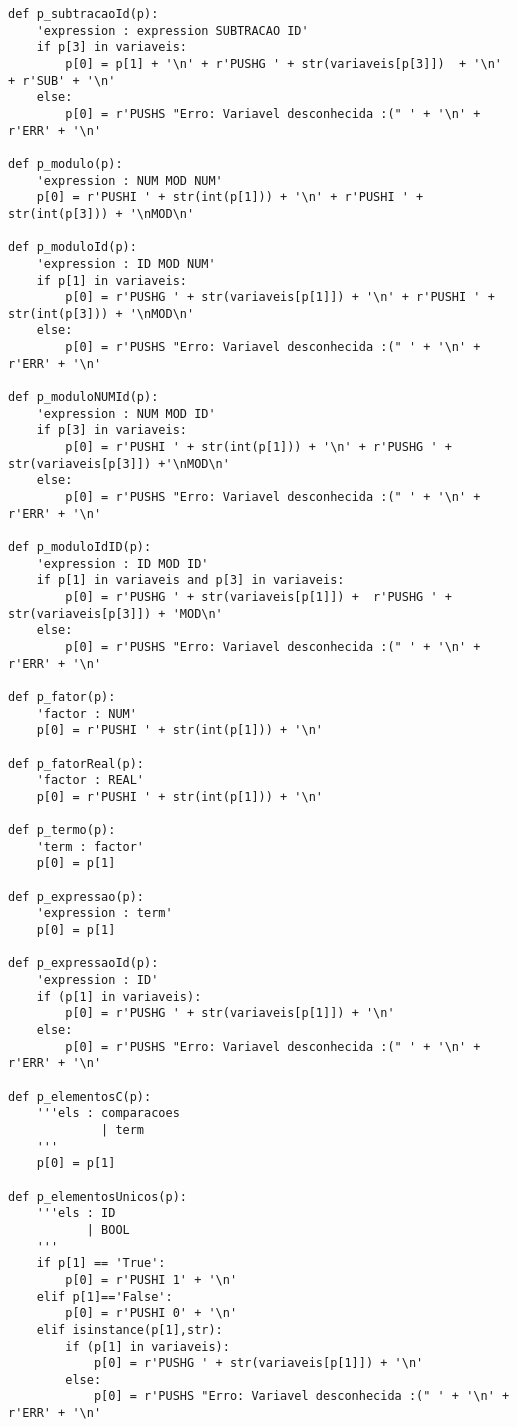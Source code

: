 \documentclass[11pt,a4paper]{report}%
\begin{document}
\begin{lstlisting}
def p_subtracaoId(p): 
    'expression : expression SUBTRACAO ID'
    if p[3] in variaveis: 
        p[0] = p[1] + '\n' + r'PUSHG ' + str(variaveis[p[3]])  + '\n' + r'SUB' + '\n'
    else: 
        p[0] = r'PUSHS "Erro: Variavel desconhecida :(" ' + '\n' + r'ERR' + '\n'

def p_modulo(p): 
    'expression : NUM MOD NUM'
    p[0] = r'PUSHI ' + str(int(p[1])) + '\n' + r'PUSHI ' + str(int(p[3])) + '\nMOD\n'

def p_moduloId(p): 
    'expression : ID MOD NUM'
    if p[1] in variaveis: 
        p[0] = r'PUSHG ' + str(variaveis[p[1]]) + '\n' + r'PUSHI ' + str(int(p[3])) + '\nMOD\n'
    else: 
        p[0] = r'PUSHS "Erro: Variavel desconhecida :(" ' + '\n' + r'ERR' + '\n'

def p_moduloNUMId(p): 
    'expression : NUM MOD ID'
    if p[3] in variaveis:
        p[0] = r'PUSHI ' + str(int(p[1])) + '\n' + r'PUSHG ' + str(variaveis[p[3]]) +'\nMOD\n'
    else: 
        p[0] = r'PUSHS "Erro: Variavel desconhecida :(" ' + '\n' + r'ERR' + '\n'

def p_moduloIdID(p): 
    'expression : ID MOD ID'
    if p[1] in variaveis and p[3] in variaveis:
        p[0] = r'PUSHG ' + str(variaveis[p[1]]) +  r'PUSHG ' + str(variaveis[p[3]]) + 'MOD\n'
    else: 
        p[0] = r'PUSHS "Erro: Variavel desconhecida :(" ' + '\n' + r'ERR' + '\n'

def p_fator(p):
    'factor : NUM'
    p[0] = r'PUSHI ' + str(int(p[1])) + '\n'

def p_fatorReal(p):
    'factor : REAL'
    p[0] = r'PUSHI ' + str(int(p[1])) + '\n'

def p_termo(p):
    'term : factor'
    p[0] = p[1]

def p_expressao(p):
    'expression : term'
    p[0] = p[1]
    
def p_expressaoId(p): 
    'expression : ID'
    if (p[1] in variaveis):
        p[0] = r'PUSHG ' + str(variaveis[p[1]]) + '\n'
    else: 
        p[0] = r'PUSHS "Erro: Variavel desconhecida :(" ' + '\n' + r'ERR' + '\n'

def p_elementosC(p):
    '''els : comparacoes
             | term 
    '''
    p[0] = p[1]

def p_elementosUnicos(p): 
    '''els : ID
           | BOOL
    '''
    if p[1] == 'True': 
        p[0] = r'PUSHI 1' + '\n'
    elif p[1]=='False': 
        p[0] = r'PUSHI 0' + '\n'
    elif isinstance(p[1],str):  
        if (p[1] in variaveis):
            p[0] = r'PUSHG ' + str(variaveis[p[1]]) + '\n'
        else: 
            p[0] = r'PUSHS "Erro: Variavel desconhecida :(" ' + '\n' + r'ERR' + '\n'


\end{lstlisting}
\end{document}
